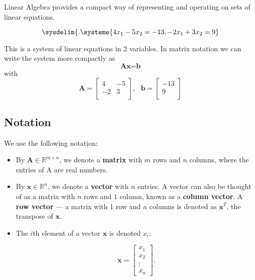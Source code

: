 Linear Algebra provides a compact way of representing and operating on sets of linear equations.


\begin{equation*}
\sysdelim\{.\systeme{4x_{1}-5x_{2}=-13,-2x_{1}+3x_{2}=9}
\end{equation*}

This is a system of linear equations in 2 variables. In matrix notation we can write the system more compactly as 
\begin{equation*}
\textbf{A}\textbf{x}=\textbf{b}
\end{equation*}
with
\begin{equation*}
\textbf{A}= \left[ \begin{array}{cc}
4 & -5 \\
-2 & 3 \\
\end{array} \right], \text{	} \textbf{b}= \left[ \begin{array}{c}
-13 \\
9 \\
\end{array}\right]
\end{equation*}

\subsection{Notation}

We use the following notation:

\begin{itemize}

\item By $\textbf{A} \in \mathbb{R}^{m \times n}$, we denote a {\bf matrix} with $m$ rows and $n$ columns, where the 
entries of A are real numbers.

\item By $\textbf{x} \in \mathbb{R}^{n}$, we denote a {\bf vector} with $n$ entries. A vector can also be thought of as a matrix with $n$ rows and $1$ column, known as a {\bf column vector}. A {\bf row vector} --- a matrix with 1 row and $n$ columns is denoted as $\textbf{x}^{T}$, the transpose of $\textbf{x}$.

\item The $i$th element of a vector $\textbf{x}$ is denoted $x_{i}$:

\begin{equation*}
\textbf{x} = \left[\begin{array}{c}
x_{1} \\
x_{2} \\
\vdots \\
x_{n}
\end{array}\right].
\end{equation*}
\end{itemize}

